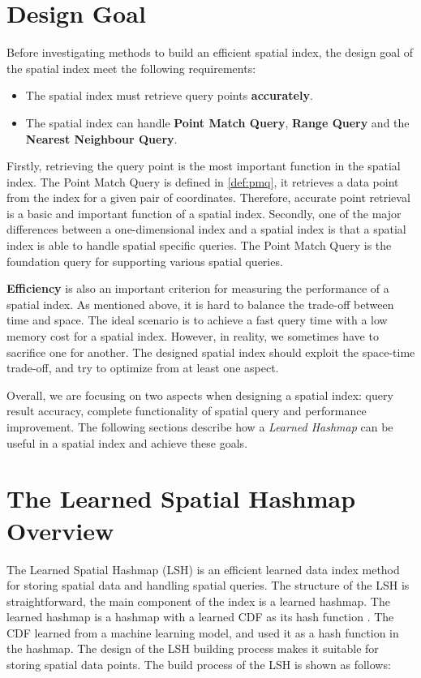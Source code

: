 \section{Design Goal}

Before investigating methods to build an efficient spatial index, the design goal of the spatial index meet the following requirements:
\begin{itemize}
    \item The spatial index must retrieve query points \textbf{accurately}. 
    \item The spatial index can handle \textbf{Point Match Query}, \textbf{Range Query} and the \textbf{Nearest Neighbour Query}.
\end{itemize}


Firstly, retrieving the query point is the most important function in the spatial index. The Point Match Query is defined in \ref{def:pmq}, it retrieves a data point from the index for a given pair of coordinates. Therefore, accurate point retrieval is a basic and important function of a spatial index. Secondly, one of the major differences between a one-dimensional index and a spatial index is that a spatial index is able to handle spatial specific queries. The Point Match Query is the foundation query for supporting various spatial queries.


\textbf{Efficiency} is also an important criterion for measuring the performance of a spatial index. As mentioned above, it is hard to balance the trade-off between time and space. The ideal scenario is to achieve a fast query time with a low memory cost for a spatial index. However, in reality, we sometimes have to sacrifice one for another. The designed spatial index should exploit the space-time trade-off, and try to optimize from at least one aspect. 

Overall, we are focusing on two aspects when designing a spatial index: query result accuracy, complete functionality of spatial query and performance improvement. The following sections describe how a \textit{Learned Hashmap} can be useful in a spatial index and achieve these goals. 


\section{The Learned Spatial Hashmap Overview}
The Learned Spatial Hashmap (LSH) is an efficient learned data index method for storing spatial data and handling spatial queries. The structure of the LSH is straightforward, the main component of the index is a learned hashmap. The learned hashmap is a hashmap with a learned CDF as its hash function \cite{Kraska:2017vh}. The CDF learned from a machine learning model, and used it as a hash function in the hashmap. The design of the LSH building process makes it suitable for storing spatial data points. The build process of the LSH is shown as follows:

